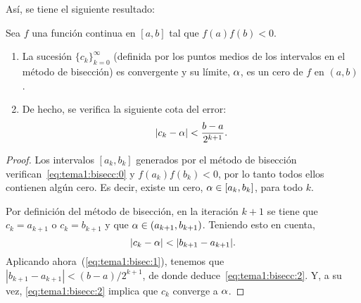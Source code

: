 Así, se tiene el siguiente resultado:
\begin{theorem}
  \label{thm:tema1:bisecc}
  Sea $f$ una función continua en $[a,b]$ tal que $f(a)f(b)<0$.
  \begin{enumerate}
  \item La sucesión $\{c_k\}_{k=0}^\infty$ (definida por los puntos
    medios de los intervalos en el método de bisección) es convergente
    y su límite, $\alpha$, es un cero de $f$ en $(a,b)$.
  \item De hecho, se verifica la siguiente cota del error:
    \begin{equation}
      \label{eq:tema1:bisecc:2}
      |c_k-\alpha| < \frac{b-a}{2^{k+1}}.
    \end{equation}
  \end{enumerate}
\end{theorem}

\begin{proof}
  Los intervalos $[a_k,b_k]$ generados por el método de bisección
  verifican~\eqref{eq:tema1:bisecc:0} y $f(a_k)f(b_k)<0$, por lo tanto
  todos ellos contienen algún cero. Es decir, existe un cero,
  $\alpha\in [a_k,b_k]$, para todo $k$.

  Por definición del método de bisección, en la iteración $k+1$ se
  tiene que $c_k=a_{k+1}$ o $c_k=b_{k+1}$ y que
  $\alpha \in (a_{k+1},b_{k+1})$. Teniendo esto en cuenta,
  $$|c_k-\cero|<|b_{k+1}-a_{k+1}|.$$
  Aplicando ahora~(\ref{eq:tema1:bisec:1}), tenemos que
  $|b_{k+1}-a_{k+1}|<(b-a)/2^{k+1}$, de donde
  deduce~\eqref{eq:tema1:bisecc:2}. Y, a su vez,
  \eqref{eq:tema1:bisecc:2} implica que $c_k$ converge a $\alpha$.
\end{proof}


